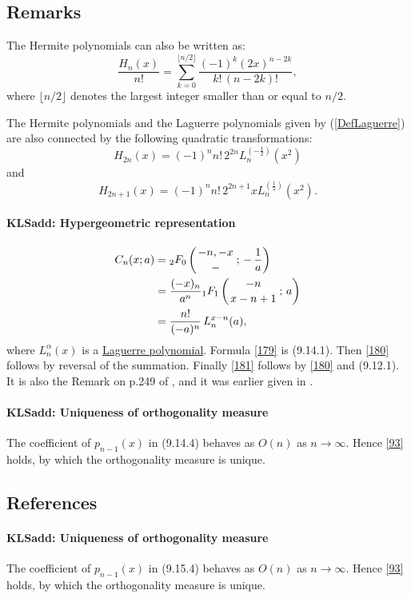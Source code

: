 \documentclass[envcountchap,graybox]{svmono}
\newcommand{\hyp}[5]{\mbox{}_{#1}{F}_{#2}
\left(\genfrac{}{}{0pt}{}{#3}{#4}\,;\,#5\right)}
\newcommand\al\alpha
\newcommand\iy\infty
\newcommand{\hyp}[5]{\,\mbox{}_{#1}F_{#2}\!\left(
  \genfrac{}{}{0pt}{}{#3}{#4};#5\right)}
\begin{document}
\subsection*{Remarks}
The Hermite polynomials can also be written as:
$$\frac{H_n(x)}{n!}=\sum_{k=0}^{\lfloor n/2\rfloor}
\frac{(-1)^k(2x)^{n-2k}}{k!\,(n-2k)!},$$
where $\lfloor n/2\rfloor$ denotes the largest integer smaller than or equal to $n/2$.

\noindent
The Hermite polynomials and the Laguerre polynomials given by (\ref{DefLaguerre}) are also
connected by the following quadratic transformations:
$$H_{2n}(x)=(-1)^nn!\,2^{2n}L_n^{(-\frac{1}{2})}(x^2)$$
and
$$H_{2n+1}(x)=(-1)^nn!\,2^{2n+1}xL_n^{(\frac{1}{2})}(x^2).$$
%
\paragraph{\large\bf KLSadd: Hypergeometric representation}\begin{align}
C_n(x;a)&=\hyp20{-n,-x}-{-\,\frac1a}
\label{179}\\
&=\frac{(-x)_n}{a^n} \hyp11{-n}{x-n+1}a
\label{180}\\
&=\frac{n!}{(-a)^n}\,L_n^{x-n}(a),
\label{181}
\end{align}
where $L_n^\al(x)$ is a
\hyperref[sec9.12]{Laguerre polynomial}.
Formula \eqref{179} is (9.14.1). Then \eqref{180} follows by reversal
of the summation. Finally \eqref{181} follows by \eqref{180} and
(9.12.1). It is also the Remark on p.249 of , and it
was earlier given in .
%
\paragraph{\large\bf KLSadd: Uniqueness of orthogonality measure}The coefficient of $p_{n-1}(x)$ in (9.14.4) behaves as $O(n)$ as $n\to\iy$.
Hence \eqref{93} holds, by which the orthogonality measure is unique.
%
\subsection*{References}
\label{sec9.15}
%
\paragraph{\large\bf KLSadd: Uniqueness of orthogonality measure}The coefficient of $p_{n-1}(x)$ in (9.15.4) behaves as $O(n)$ as $n\to\iy$.
Hence \eqref{93} holds, by which the orthogonality measure is unique.
%
\end{document}
